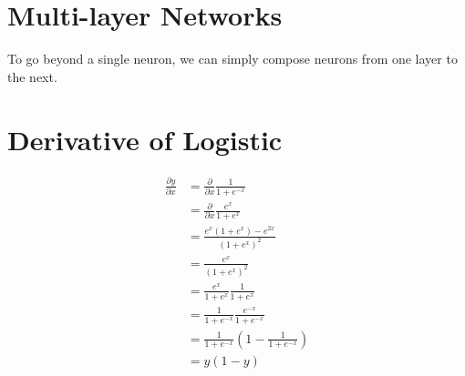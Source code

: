 \documentclass{article}
\begin{document}
\section{Multi-layer Networks}

To go beyond a single neuron, we can simply compose neurons from one layer to the next.

\section{Derivative of Logistic}

\begin{align}
\frac{\partial y}{\partial x} & = \frac{\partial}{\partial x}\frac{1}{1 + e^{-x}} \\
&= \frac{\partial}{\partial x}\frac{e^x}{1 + e^x} \\
&= \frac{e^x (1 + e^x) - e^{2x}}{(1 + e^x)^2} \\
&= \frac{e^x}{(1 + e^x)^2} \\
&= \frac{e^x}{1 + e^x} \frac{1}{1 + e^x} \\
&= \frac{1}{1 + e^{-x}} \frac{e^{-x}}{1 + e^{-x}} \\
&= \frac{1}{1 + e^{-x}} \left(1 - \frac{1}{1 + e^{-x}} \right) \\
&= y (1 - y)
\end{align}
\end{document}
